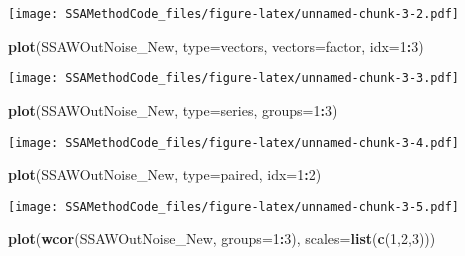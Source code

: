 \documentclass[
]{article}
\newenvironment{Shaded}{\begin{snugshade}}{\end{snugshade}}
\newcommand{\AttributeTok}[1]{\textcolor[rgb]{0.13,0.29,0.53}{#1}}
\newcommand{\DecValTok}[1]{\textcolor[rgb]{0.00,0.00,0.81}{#1}}
\newcommand{\FunctionTok}[1]{\textcolor[rgb]{0.13,0.29,0.53}{\textbf{#1}}}
\newcommand{\NormalTok}[1]{#1}
\newcommand{\SpecialCharTok}[1]{\textcolor[rgb]{0.81,0.36,0.00}{\textbf{#1}}}
\newcommand{\StringTok}[1]{\textcolor[rgb]{0.31,0.60,0.02}{#1}}
\begin{document}
\texttt{[image: SSAMethodCode\_files/figure-latex/unnamed-chunk-3-2.pdf]}

\begin{Shaded}
\begin{Highlighting}[]
\FunctionTok{plot}\NormalTok{(SSAWOutNoise\_New, }\AttributeTok{type=}\StringTok{\textquotesingle{}vectors\textquotesingle{}}\NormalTok{, }\AttributeTok{vectors=}\StringTok{\textquotesingle{}factor\textquotesingle{}}\NormalTok{, }\AttributeTok{idx=}\DecValTok{1}\SpecialCharTok{:}\DecValTok{3}\NormalTok{)}
\end{Highlighting}
\end{Shaded}

\texttt{[image: SSAMethodCode\_files/figure-latex/unnamed-chunk-3-3.pdf]}

\begin{Shaded}
\begin{Highlighting}[]
\FunctionTok{plot}\NormalTok{(SSAWOutNoise\_New, }\AttributeTok{type=}\StringTok{\textquotesingle{}series\textquotesingle{}}\NormalTok{, }\AttributeTok{groups=}\DecValTok{1}\SpecialCharTok{:}\DecValTok{3}\NormalTok{)}
\end{Highlighting}
\end{Shaded}

\texttt{[image: SSAMethodCode\_files/figure-latex/unnamed-chunk-3-4.pdf]}

\begin{Shaded}
\begin{Highlighting}[]
\FunctionTok{plot}\NormalTok{(SSAWOutNoise\_New, }\AttributeTok{type=}\StringTok{\textquotesingle{}paired\textquotesingle{}}\NormalTok{, }\AttributeTok{idx=}\DecValTok{1}\SpecialCharTok{:}\DecValTok{2}\NormalTok{)}
\end{Highlighting}
\end{Shaded}

\texttt{[image: SSAMethodCode\_files/figure-latex/unnamed-chunk-3-5.pdf]}

\begin{Shaded}
\begin{Highlighting}[]
\FunctionTok{plot}\NormalTok{(}\FunctionTok{wcor}\NormalTok{(SSAWOutNoise\_New, }\AttributeTok{groups=}\DecValTok{1}\SpecialCharTok{:}\DecValTok{3}\NormalTok{), }\AttributeTok{scales=}\FunctionTok{list}\NormalTok{(}\FunctionTok{c}\NormalTok{(}\DecValTok{1}\NormalTok{,}\DecValTok{2}\NormalTok{,}\DecValTok{3}\NormalTok{)))}
\end{Highlighting}
\end{Shaded}
\end{document}
